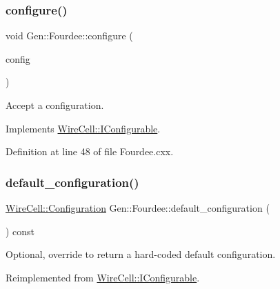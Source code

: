 \subsubsection{\texorpdfstring{configure()}{configure()}}
{\footnotesize\ttfamily void Gen\+::\+Fourdee\+::configure (\begin{DoxyParamCaption}\item[{const \hyperlink{namespace_wire_cell_a9f705541fc1d46c608b3d32c182333ee}{Wire\+Cell\+::\+Configuration} \&}]{config }\end{DoxyParamCaption})\hspace{0.3cm}{\ttfamily [virtual]}}



Accept a configuration. 



Implements \hyperlink{class_wire_cell_1_1_i_configurable_a57ff687923a724093df3de59c6ff237d}{Wire\+Cell\+::\+I\+Configurable}.



Definition at line 48 of file Fourdee.\+cxx.

\mbox{\label{class_wire_cell_1_1_gen_1_1_fourdee_a36c5e467b00f1598b8063f30aa33d981}} 
\subsubsection{\texorpdfstring{default\+\_\+configuration()}{default\_configuration()}}
{\footnotesize\ttfamily \hyperlink{namespace_wire_cell_a9f705541fc1d46c608b3d32c182333ee}{Wire\+Cell\+::\+Configuration} Gen\+::\+Fourdee\+::default\+\_\+configuration (\begin{DoxyParamCaption}{ }\end{DoxyParamCaption}) const\hspace{0.3cm}{\ttfamily [virtual]}}



Optional, override to return a hard-\/coded default configuration. 



Reimplemented from \hyperlink{class_wire_cell_1_1_i_configurable_a54841b2da3d1ea02189478bff96f7998}{Wire\+Cell\+::\+I\+Configurable}.



